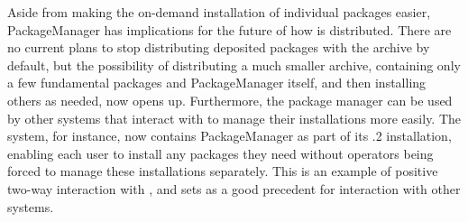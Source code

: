 Aside from making the on-demand installation of individual packages easier, {\sf
  PackageManager} has implications for the future of how \GAP is distributed.
There are no current plans to stop distributing
deposited packages with the \GAP archive by default, but the
possibility of distributing a much smaller archive, containing only a few
fundamental packages and {\sf
  PackageManager} itself, and then installing others as needed, now
opens up.  Furthermore, the package manager
can be used by other systems that interact with \GAP to manage
their \GAP installations more easily.  The \cocalc system, for instance, now contains {\sf PackageManager}
as part of its .2 installation, enabling each user to install any
packages they need without \cocalc operators being forced to manage these
installations separately.  This is an example of positive two-way interaction
with \cocalc, and sets as a good precedent for interaction with other
systems.

